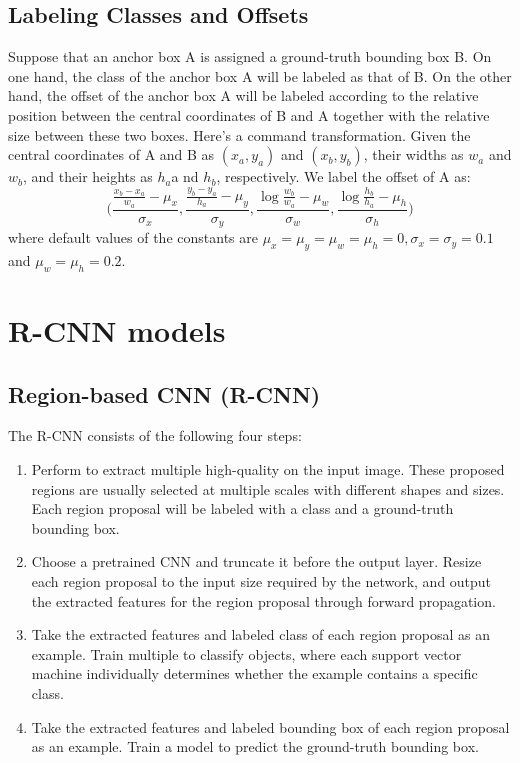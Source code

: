 \subsection{Labeling Classes and Offsets}
\label{sec:label-class-offs}

Suppose that an anchor box A is assigned a ground-truth bounding box B.
On one hand, the class of the anchor box A will be labeled as that of B.
On the other hand, the offset of the anchor box A will be labeled according to the relative position between the central coordinates of B and A together with the relative size between these two boxes.
Here's a command transformation.
Given the central coordinates of A and B as \((x_{a}, y_{a})\) and \((x_{b},y_{b})\), their widths as \(w_{a}\) and \(w_{b}\), and their heights as \(h_{a}\)a nd \(h_{b}\), respectively.
We label the offset of A as:
\begin{equation}
  \label{eq:2}
  \bigl(
  \frac{\frac{x_{b}-x_{a}}{w_{a}}-\mu_{x}}{\sigma_{x}},   \frac{\frac{y_{b}-y_{a}}{h_{a}}-\mu_{y}}{\sigma_{y}},
  \frac{\log\frac{w_{b}}{w_{a}}-\mu_{w}}{\sigma_{w}},  \frac{\log\frac{h_{b}}{h_{a}}-\mu_{h}}{\sigma_{h}}
  \bigr)
\end{equation}
where default values of the constants are \(\mu_{x}=\mu_{y}=\mu_{w}=\mu_{h}=0, \sigma_{x}=\sigma_{y}=0.1\) and \(\mu_{w}=\mu_{h}=0.2\).




\section{R-CNN models}

\subsection{Region-based CNN (R-CNN)}
\label{sec:region-based-cnn}

The R-CNN consists of the following four steps:
\begin{enumerate}
\item Perform  to extract multiple high-quality  on the input image.
  These proposed regions are usually selected at multiple scales with different shapes and sizes.
  Each region proposal will be labeled with a class and a ground-truth bounding box.
\item Choose a pretrained CNN and truncate it before the output layer.
  Resize each region proposal to the input size required by the network, and output the extracted features for the region proposal through forward propagation.
\item Take the extracted features and labeled class of each region proposal as an example.
  Train multiple  to classify objects, where each support vector machine individually determines whether the example contains a specific class.
\item Take the extracted features and labeled bounding box of each region proposal as an example.
  Train a  model to predict the ground-truth bounding box.
\end{enumerate}

